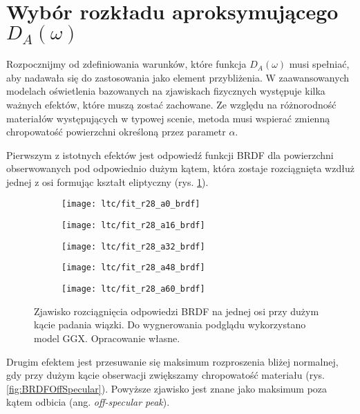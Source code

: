 \documentclass[../main.tex]{subfiles}
\begin{document}
\section{Wybór rozkładu aproksymującego $D_A(\omega)$}
\label{ltc:chapter:choosingD}
Rozpocznijmy od zdefiniowania warunków, które funkcja $D_A(\omega)$ musi spełniać, aby nadawała się do zastosowania jako element przybliżenia. W zaawansowanych modelach oświetlenia bazowanych na zjawiskach fizycznych występuje kilka ważnych efektów, które muszą zostać zachowane. Ze względu na różnorodność materiałów występujących w typowej scenie, metoda musi wspierać zmienną chropowatość powierzchni określoną przez parametr $\alpha$.

Pierwszym z istotnych efektów jest odpowiedź funkcji BRDF dla powierzchni obserwowanych pod odpowiednio dużym kątem, która zostaje rozciągnięta wzdłuż jednej z osi formując kształt eliptyczny (rys. \ref{fig:BRDFGrazingAnisotropy}).

\begin{figure}
    \centering
    
    \begin{subfigure}[t]{0.18\textwidth}
        \texttt{[image: ltc/fit\_r28\_a0\_brdf]}
    \end{subfigure}
    \begin{subfigure}[t]{0.18\textwidth}
        \texttt{[image: ltc/fit\_r28\_a16\_brdf]}
    \end{subfigure}
    \begin{subfigure}[t]{0.18\textwidth}
        \texttt{[image: ltc/fit\_r28\_a32\_brdf]}
    \end{subfigure}
    \begin{subfigure}[t]{0.18\textwidth}
        \texttt{[image: ltc/fit\_r28\_a48\_brdf]}
    \end{subfigure}
    \begin{subfigure}[t]{0.18\textwidth}
        \texttt{[image: ltc/fit\_r28\_a60\_brdf]}
    \end{subfigure}
    
    \caption{Zjawisko rozciągnięcia odpowiedzi BRDF na jednej osi przy dużym kącie padania wiązki. Do wygnerowania podglądu wykorzystano model GGX. Opracowanie własne.}
    \label{fig:BRDFGrazingAnisotropy}
\end{figure}

Drugim efektem jest przesuwanie się maksimum rozproszenia bliżej normalnej, gdy przy dużym kącie obserwacji zwiększamy chropowatość materiału (rys. \ref{fig:BRDFOffSpecular}). Powyższe zjawisko jest znane jako maksimum poza kątem odbicia (ang. \textit{off-specular peak}).
\end{document}
